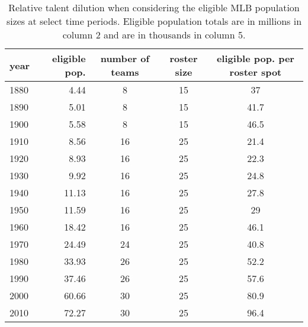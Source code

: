 \documentclass[11pt]{article}\usepackage[]{graphicx}\usepackage[]{color}
\begin{document}
\begin{table}[h!]
\begin{center}
\begin{tabular}{lrccc}
\hline
year & eligible pop. & number of teams & roster size & eligible pop. per roster spot \\
\hline
1880 & 4.44  & 8  & 15 & 37   \\
1890 & 5.01  & 8  & 15 & 41.7   \\
1900 & 5.58  & 8  & 15 & 46.5   \\
1910 & 8.56  & 16 & 25 & 21.4  \\
1920 & 8.93  & 16 & 25 & 22.3  \\
1930 & 9.92  & 16 & 25 & 24.8  \\
1940 & 11.13  & 16 & 25 & 27.8  \\
1950 & 11.59  & 16 & 25 & 29  \\
1960 & 18.42  & 16 & 25 & 46.1  \\
1970 & 24.49  & 24 & 25 & 40.8  \\
1980 & 33.93 & 26 & 25 & 52.2 \\
1990 & 37.46 & 26 & 25 & 57.6 \\
2000 & 60.66 & 30 & 25 & 80.9 \\
2010 & 72.27 & 30 & 25 & 96.4 \\
\hline
\end{tabular}
\end{center}
\caption{Relative talent dilution when considering the eligible MLB population 
  sizes at select time periods. Eligible population totals are in millions in 
  column 2 and are in thousands in column 5. }
\label{dilution}
\end{table}
\end{document}
